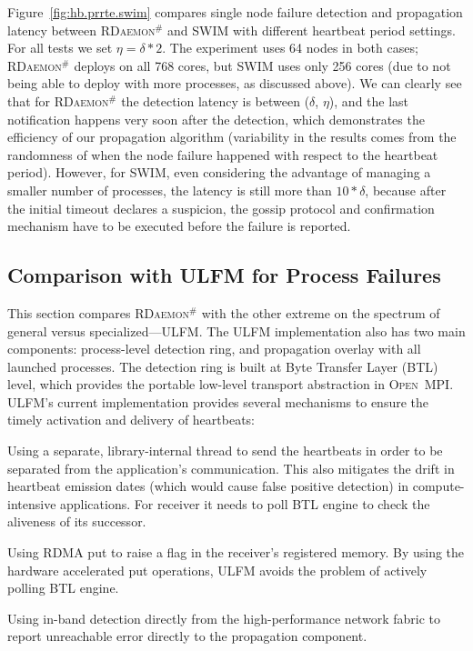 \documentclass[5p,times,twocolumn]{elsarticle}
\newcommand{\ompi}[0]{\textsc{Open~MPI}\xspace}
\newcommand{\ulfm}[0]{\textsc{ULFM}\xspace}
\newcommand{\ourwork}[0]{\textsc{RDaemon}\ensuremath{^\#}\xspace}
\begin{document}
Figure~\ref{fig:hb.prrte.swim} compares single node failure detection and propagation latency between \ourwork and SWIM
with different heartbeat period settings. For all tests we set $ \eta = \delta * 2 $. The
experiment uses 64 nodes in both cases; \ourwork deploys on all 768 cores, but SWIM uses only
256 cores (due to not being able to deploy with more processes, as discussed above).
 We can clearly see that for \ourwork the detection latency is between ($\delta$, $\eta$), and the last notification happens very soon after the detection, which demonstrates the efficiency of our propagation algorithm (variability in the results comes from the randomness of when the node failure happened with respect to the heartbeat period). However, for SWIM, even considering the advantage of managing a
 smaller number of processes, the latency is still more than $10*\delta$, because after the initial timeout declares a suspicion, the gossip protocol and confirmation mechanism have to be executed
before the failure is reported.

\subsection{Comparison with \ulfm for Process Failures}
This section compares \ourwork with the other extreme on the spectrum of
general versus specialized---\ulfm. The \ulfm implementation also has two
 main components: process-level detection ring, and propagation overlay with all launched processes. The detection ring is built at Byte Transfer Layer (BTL) level, which provides the portable low-level transport abstraction in \ompi. \ulfm's current implementation provides several mechanisms to ensure the timely activation and delivery of heartbeats:
\begin{compactenum}
  \item Using a separate, library-internal thread to send the heartbeats in order to be separated from the application's communication. This also mitigates the drift in heartbeat
  emission dates (which would cause false positive detection) in compute-intensive applications.
  For receiver it needs to poll BTL engine to check the aliveness of its successor.
  \item Using RDMA put to raise a flag in the receiver's registered memory. By using the hardware accelerated put operations, \ulfm avoids the problem of actively polling BTL engine.
  \item Using in-band detection directly from the high-performance network
  fabric to report unreachable error directly to the propagation component.
\end{compactenum}
\end{document}
